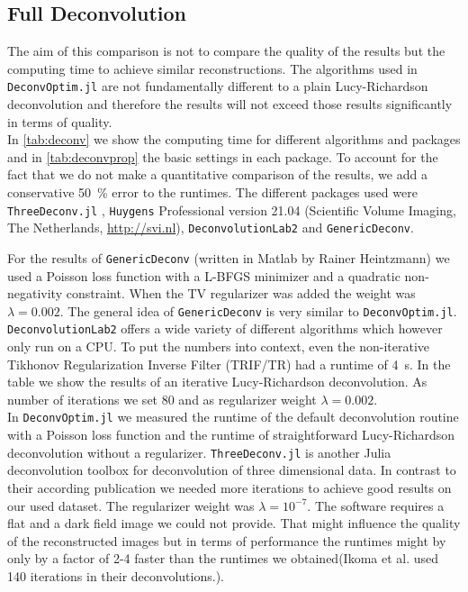 \documentclass{juliacon}
\begin{document}
    \subsection{Full Deconvolution}
        The aim of this comparison is not to compare the quality of the results but the computing time to achieve similar reconstructions. The algorithms used in \verb|DeconvOptim.jl| are not fundamentally different to a plain Lucy-Richardson deconvolution and therefore the results will 
        not exceed those results significantly in terms of quality.\\
        In \autoref{tab:deconv} we show the computing time for different algorithms and packages and in \autoref{tab:deconvprop} the basic settings
        in each package.
        To account for the fact that we do not make a quantitative comparison of the results, we add a conservative \SI{50}{\percent} error
        to the runtimes.
        The different packages used were \verb|ThreeDeconv.jl| \cite{ikoma2018convex}, \verb|Huygens| Professional version 21.04 (Scientific Volume Imaging, The Netherlands, \url{http://svi.nl}), \verb|DeconvolutionLab2| \cite{deconvlab2} and \verb|GenericDeconv|.  

        For the results of \verb|GenericDeconv| (written in Matlab by Rainer Heintzmann) we used a Poisson loss function with a L-BFGS minimizer and a quadratic non-negativity constraint.
        When the TV regularizer was added the weight was $\lambda = 0.002$.
        The general idea of \verb|GenericDeconv| is very similar to \verb|DeconvOptim.jl|.
        \verb|DeconvolutionLab2| offers a wide variety of different algorithms which however only run on a CPU. To put the numbers into context, even the non-iterative Tikhonov Regularization Inverse Filter (TRIF/TR) had a runtime of \SI{4}{\second}. In the table we show the results of an 
        iterative Lucy-Richardson deconvolution. As number of iterations we set 80 and as regularizer weight $\lambda=0.002$.\\
        In \verb|DeconvOptim.jl| we measured the runtime of the default deconvolution routine with a Poisson loss function
        and the runtime of straightforward Lucy-Richardson deconvolution without a regularizer.
        \verb|ThreeDeconv.jl| is another Julia deconvolution toolbox for deconvolution of three dimensional data.
        In contrast to their according publication \cite{ikoma2018convex} we needed more iterations to achieve good results
        on our used dataset. The regularizer weight was $\lambda=10^{-7}$. 
        The software requires a flat and a dark field image we could not provide. That might influence the quality of the reconstructed images
        but in terms of performance the runtimes might by only by a factor of 2-4 faster than the runtimes we obtained(Ikoma et al. used 140 iterations in their deconvolutions.).
\end{document}
